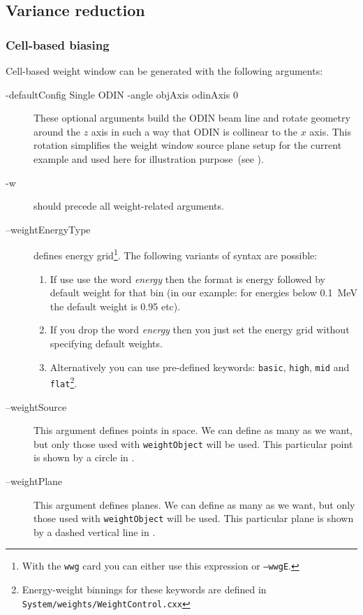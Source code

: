 \subsection{Variance reduction}
\subsubsection{Cell-based biasing}
\label{sec:vr:cell}

Cell-based weight window can be generated with the following arguments:



\begin{description}
\item[-defaultConfig Single ODIN -angle objAxis odinAxis 0] These optional arguments build the ODIN beam line
  and rotate geometry around the $z$ axis in such a way that ODIN is collinear to the $x$ axis.
  This rotation simplifies the weight window source plane setup for the current example and used here for
  illustration purpose~(see ).
\item[-w] should precede all weight-related arguments.
\item[--weightEnergyType] defines energy grid\footnote{With the {\tt wwg} card you can either use this expression or {\tt --wwgE}.}.
  The following variants of syntax are possible:
  \begin{enumerate}
    \item If use use the word {\em energy} then the format is energy followed by default weight for that bin
      (in our example: for energies below \SI{0.1}{\mega\electronvolt} the default weight is 0.95 etc).
    \item If you drop the word {\em energy} then you just set the energy grid without specifying default weights.
    \item Alternatively you can use pre-defined keywords:
      {\tt basic}, {\tt high}, {\tt mid} and {\tt flat}\footnote{Energy-weight binnings for these keywords are defined in \tt{System/weights/WeightControl.cxx}}.
    \end{enumerate}
\item[--weightSource] This argument defines points in space. We can define as many as we want, but only those used with {\tt weightObject} will be used. This particular point is shown by a circle in .
\item[--weightPlane] This argument defines planes. We can define as many as we want, but only those used with {\tt weightObject} will be used. This particular plane is shown by a dashed vertical line in .

\end{description}
